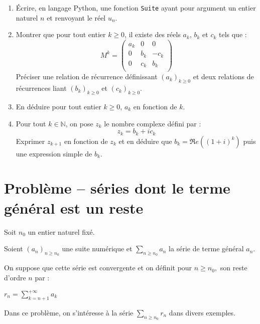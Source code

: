 \documentclass[twoside,french,11pt]{VcCours}
\begin{document}
\begin{enumerate}
\item Écrire, en langage Python, une fonction {\tt Suite} ayant pour argument un entier naturel $n$ et renvoyant le réel $u_n$.
\item Montrer que pour tout entier $k \geq 0$, il existe des réels $a_k$, $b_k$ et $c_k$ tels que :
$$ M^k = \begin{pmatrix}
a_k & 0 & 0 \\
0 & b_k & -c_k \\
0 & c_k & b_k \\
\end{pmatrix}$$
Préciser une relation de récurrence définissant $(a_k)_{k \geq 0}$ et deux relations de récurrences liant $(b_k)_{k \geq 0}$ et $(c_k)_{k \geq 0}$.
\item En déduire pour tout entier $k \geq 0$, $a_k$ en fonction de $k$.
\item Pour tout $k \in \mathbb{N}$, on pose $z_k$ le nombre complexe défini par :
$$ z_k = b_k + i c_k$$
Exprimer $z_{k+1}$ en fonction de $z_k$ et en déduire que $b_k = \Re e((1+i)^k)$ puis une expression simple de $b_k$.
\end{enumerate}

  
\section*{Problème -- séries dont le terme général est un reste}
  Soit $n_0$ un entier naturel fixé.

  Soient $(a_n)_{n\geq n_0}$ une suite numérique et $\sum_{n \geq n_0} a_n$ la
  série de terme général $a_n.$ 
  
  \medskip
  
  On suppose que cette série est convergente et on définit pour $n\geq n_0,$ son reste
  d'ordre $n$ par :
  \begin{center}$r_n=\sum_{k=n+1}^{+\infty}a_k$
  \end{center}
  Dans ce problème, on s'intéresse à la
  série $\sum_{n \geq n_0} r_n$ dans divers exemples.
  
  \medskip
  
\end{document}
